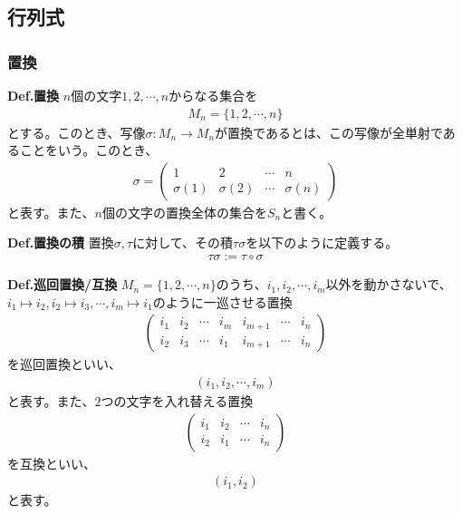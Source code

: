 \documentclass[a4paper,11pt]{jsarticle}
\numberwithin{equation}{section}
\begin{document}
\subsection{行列式}
\subsubsection{置換}
\begin{itembox}[l]{\textbf{Def.置換}}
  $n$個の文字$1,2,\cdots,n$からなる集合を
  \begin{align}
    M_n = \{1,2,\cdots,n\}
  \end{align}
  とする。このとき、写像$\sigma:M_n \to M_n$が置換であるとは、この写像が全単射であることをいう。このとき、
  \begin{align}
    \sigma = \begin{pmatrix}
      1 & 2 & \cdots & n\\
      \sigma(1) & \sigma(2) & \cdots & \sigma(n)
    \end{pmatrix}
  \end{align}
  と表す。また、$n$個の文字の置換全体の集合を$S_n$と書く。
\end{itembox}

\begin{itembox}[l]{\textbf{Def.置換の積}}
  置換$\sigma,\tau$に対して、その積$\tau \sigma$を以下のように定義する。
  \begin{align}
    \tau \sigma := \tau \circ \sigma
  \end{align}
\end{itembox}

\begin{itembox}[l]{\textbf{Def.巡回置換/互換}}
  $M_n = \{1,2,\cdots,n\}$のうち、$i_1,i_2,\cdots,i_m$以外を動かさないで、$i_1 \mapsto i_2, i_2 \mapsto i_3, \cdots, i_m \mapsto i_1$のように一巡させる置換
  \begin{align}
    \begin{pmatrix}
      i_1 & i_2 & \cdots & i_m & i_{m+1} & \cdots & i_n\\
      i_2 & i_3 & \cdots & i_1 & i_{m+1} & \cdots & i_n
    \end{pmatrix}
  \end{align}
  を巡回置換といい、
  \begin{align}
    (i_1,i_2,\cdots,i_m)
  \end{align}
  と表す。また、$2$つの文字を入れ替える置換
  \begin{align}
    \begin{pmatrix}
      i_1 & i_2 & \cdots & i_n\\
      i_2 & i_1 & \cdots & i_n
    \end{pmatrix}
  \end{align}
  を互換といい、
  \begin{align}
    (i_1,i_2)
  \end{align}
  と表す。
\end{itembox}
\end{document}
